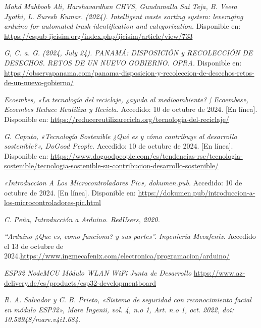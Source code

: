 \begin{thebibliography}{99}

    \textit{Mohd Mahboob Ali, Harshavardhan CHVS, Gundumalla Sai Teja, B. Veera Jyothi,  L. Suresh Kumar. (2024). Intelligent waste sorting system: leveraging arduino for automated trash identification and categorization.} Disponible en: \url{https://cspub-ijcisim.org/index.php/ijcisim/article/view/733} 

    \textit{G, C. a. G. (2024, July 24). PANAMÁ: DISPOSICIÓN y RECOLECCIÓN DE DESECHOS. RETOS DE UN NUEVO GOBIERNO. OPRA. } Disponible en: \url{https://observapanama.com/panama-disposicion-y-recoleccion-de-desechos-retos-de-un-nuevo-gobierno/}

    \textit{Ecoembes, «La tecnología del reciclaje, ¿ayuda al medioambiente? | Ecoembes», Ecoembes Reduce Reutiliza y Recicla.} Accedido: 10 de octubre de 2024. [En línea]. Disponible en: \url{https://reducereutilizarecicla.org/tecnologia-del-reciclaje/}
    
    \textit{G. Caputo, «Tecnología Sostenible ¿Qué es y cómo contribuye al desarrollo sostenible?», DoGood People.} Accedido: 10 de octubre de 2024. [En línea]. Disponible en: \url{https://www.dogoodpeople.com/es/tendencias-rsc/tecnologia-sostenible/tecnologia-sostenible-su-contribucion-desarrollo-sostenible/}
    
    \textit{«Introduccion A Los Microcontroladores Pic», dokumen.pub.} Accedido: 10 de octubre de 2024. [En línea]. Disponible en: \url{https://dokumen.pub/introduccion-a-los-microcontroladores-pic.html}
    
    \textit{C. Peña, Introducción a Arduino. RedUsers, 2020.}

    \textit{“Arduino ¿Que es, como funciona? y sus partes”. Ingeniería Mecafenix.} Accedido el 13 de octubre de 2024.\url{https://www.ingmecafenix.com/electronica/programacion/arduino/}

    \textit{ESP32 NodeMCU Módulo WLAN WiFi Junta de Desarrollo} \url{https://www.az-delivery.de/es/products/esp32-developmentboard}
    
    \textit{R. A. Salvador y C. B. Prieto, «Sistema de seguridad con reconocimiento facial en módulo ESP32», Mare Ingenii, vol. 4, n.o 1, Art. n.o 1, oct. 2022, doi: 10.52948/mare.v4i1.684.}


\end{thebibliography}
